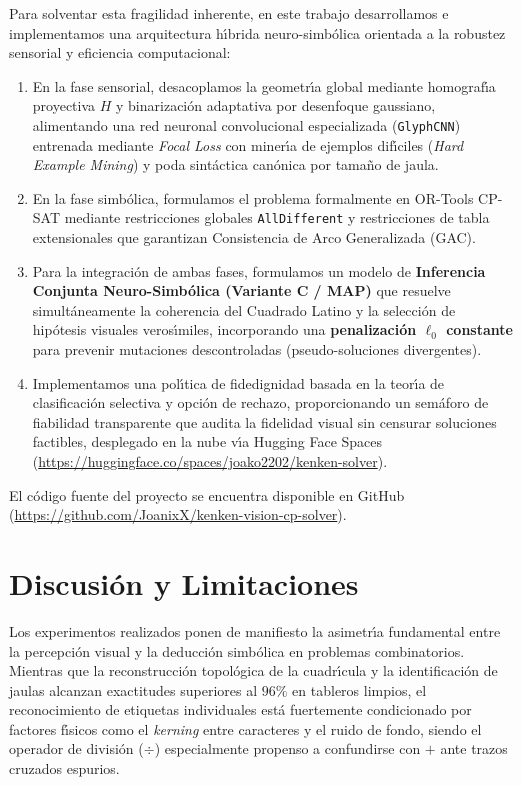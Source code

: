 \documentclass[conference]{IEEEtran}
\begin{document}
Para solventar esta fragilidad inherente, en este trabajo desarrollamos e implementamos una arquitectura h\'{\i}brida neuro-simb\'olica orientada a la robustez sensorial y eficiencia computacional:
\begin{enumerate}
    \item En la fase sensorial, desacoplamos la geometr\'{\i}a global mediante homograf\'{\i}a proyectiva $H$ y binarizaci\'on adaptativa por desenfoque gaussiano, alimentando una red neuronal convolucional especializada (\texttt{GlyphCNN}) entrenada mediante \textit{Focal Loss} con miner\'{\i}a de ejemplos dif\'{\i}ciles (\textit{Hard Example Mining}) y poda sint\'actica can\'onica por tama\~no de jaula.
    \item En la fase simb\'olica, formulamos el problema formalmente en OR-Tools CP-SAT mediante restricciones globales \texttt{AllDifferent} y restricciones de tabla extensionales que garantizan Consistencia de Arco Generalizada (GAC).
    \item Para la integraci\'on de ambas fases, formulamos un modelo de \textbf{Inferencia Conjunta Neuro-Simb\'olica (Variante C / MAP)} que resuelve simult\'aneamente la coherencia del Cuadrado Latino y la selecci\'on de hip\'otesis visuales veros\'{\i}miles, incorporando una \textbf{penalizaci\'on $\ell_0$ constante} para prevenir mutaciones descontroladas (pseudo-soluciones divergentes).
    \item Implementamos una pol\'{\i}tica de fidedignidad basada en la teor\'{\i}a de clasificaci\'on selectiva y opci\'on de rechazo, proporcionando un sem\'aforo de fiabilidad transparente que audita la fidelidad visual sin censurar soluciones factibles, desplegado en la nube v\'{\i}a Hugging Face Spaces (\url{https://huggingface.co/spaces/joako2202/kenken-solver}).
\end{enumerate}

El c\'odigo fuente del proyecto se encuentra disponible en GitHub (\url{https://github.com/JoanixX/kenken-vision-cp-solver}).











\section{Discusi\'on y Limitaciones}
\label{sec:discussion}
Los experimentos realizados ponen de manifiesto la asimetr\'{\i}a fundamental entre la percepci\'on visual y la deducci\'on simb\'olica en problemas combinatorios. Mientras que la reconstrucci\'on topol\'ogica de la cuadr\'{\i}cula y la identificaci\'on de jaulas alcanzan exactitudes superiores al $96\%$ en tableros limpios, el reconocimiento de etiquetas individuales est\'a fuertemente condicionado por factores f\'{\i}sicos como el \textit{kerning} entre caracteres y el ruido de fondo, siendo el operador de divisi\'on ($\div$) especialmente propenso a confundirse con $+$ ante trazos cruzados espurios.
\end{document}
